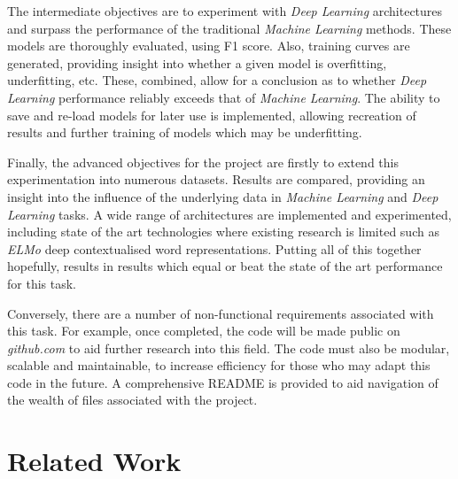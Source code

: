 \documentclass[12pt,a4paper]{article}
\begin{document}
The intermediate objectives are to experiment with \textit{Deep Learning} architectures and surpass the performance of the traditional \textit{Machine Learning} methods. These models are thoroughly evaluated, using F1 score. Also, training curves are generated, providing insight into whether a given model is overfitting, underfitting, etc. These, combined, allow for a conclusion as to whether \textit{Deep Learning} performance reliably exceeds that of \textit{Machine Learning}. The ability to save and re-load models for later use is implemented, allowing recreation of results and further training of models which may be underfitting.

Finally, the advanced objectives for the project are firstly to extend this experimentation into numerous datasets. Results are compared, providing an insight into the influence of the underlying data in \textit{Machine Learning} and \textit{Deep Learning} tasks. A wide range of architectures are implemented and experimented, including state of the art technologies where existing research is limited such as \textit{ELMo} deep contextualised word representations. Putting all of this together hopefully, results in results which equal or beat the state of the art performance for this task.

Conversely, there are a number of non-functional requirements associated with this task. For example, once completed, the code will be made public on \textit{github.com} to aid further research into this field. The code must also be modular, scalable and maintainable, to increase efficiency for those who may adapt this code in the future. A comprehensive README is provided to aid navigation of the wealth of files associated with the project.




\section{Related Work}
\end{document}
